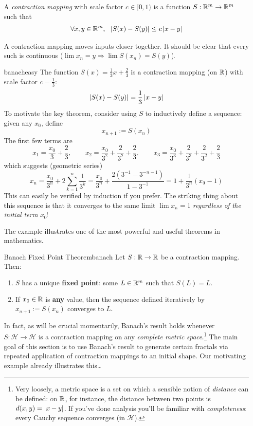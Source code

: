 \begin{defn}{}{}
	A \emph{contraction mapping} with scale factor $c\in[0,1)$ is a function $S:\mathbb{R}^m\to\mathbb{R}^m$ such that
	\[
		\forall x,y\in\mathbb{R}^m,\ \ \left| S(x)-S(y)\right|\le c\left| x-y\right|
	\]
\end{defn}

A contraction mapping moves inputs closer together. It should be clear that every such is continuous ($\lim x_n=y\Longrightarrow \lim S(x_n)=S(y)$).

\begin{example}{}{banacheasy}
	The function $S(x)=\frac 13x+\frac 23$ is a contraction mapping (on $\mathbb{R}$) with scale factor $c=\frac 13$:
	\[
		\left| S(x)-S(y)\right|=\frac 13\left| x-y\right|
	\]
	To motivate the key theorem, consider using $S$ to inductively define a sequence: given any $x_0$, define
	\[
		x_{n+1}:=S(x_n)
	\]
	The first few terms are
	\[
		x_1=\frac{x_0}3+\frac 23,\qquad x_2=\frac{x_0}{3^2}+\frac 2{3^2}+\frac 23,\qquad x_3=\frac{x_0}{3^3}+\frac 2{3^3}+\frac 2{3^2}+\frac 23
	\]
	which suggests (geometric series)
	\[
		x_n=\frac{x_0}{3^n}+2\sum_{k=1}^{n}\frac 1{3^k} 
		=\frac{x_0}{3^n}+\frac{2(3^{-1}-3^{-n-1})}{1-3^{-1}}
		=1+\frac 1{3^n}(x_0-1)
	\]
	This can easily be verified by induction if you prefer. The striking thing about this sequence is that it converges to the same limit $\lim x_n=1$ \emph{regardless of the initial term $x_0$}!
\end{example}

The example illustrates one of the most powerful and useful theorems in mathematics.

\begin{thm}{Banach Fixed Point Theorem}{banach}
	Let $S:\mathbb{R}\to\mathbb{R}$ be a contraction mapping. Then:
	\begin{enumerate}
	  \item $S$ has a unique \textbf{fixed point}: some $L\in\mathbb{R}^m$ such that $S(L)=L$.
	  \item If $x_0\in\mathbb{R}$ is \textbf{any} value, then the sequence defined iteratively by $x_{n+1}:=S(x_n)$ converges to $L$.
	\end{enumerate}
\end{thm}

In fact, as will be crucial momentarily, Banach's result holds whenever $S:\mathcal H\to\mathcal H$ is a contraction mapping on any \emph{complete metric space}.\footnote{%
	Very loosely, a metric space is a set on which a sensible notion of \emph{distance} can be defined: on $\mathbb{R}$, for instance, the distance between two points is $d(x,y)=\left| x-y\right|$. If you've done analysis you'll be familiar with \emph{completeness}: every Cauchy sequence converges (in $\mathcal H$).%
} The main goal of this section is to use Banach's result to generate certain fractals via repeated application of contraction mappings to an initial shape. Our motivating example already illustrates this\ldots


